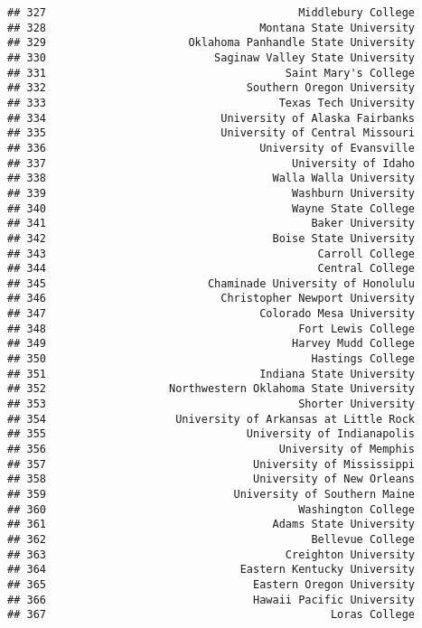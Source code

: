 \documentclass[
]{article}
\begin{document}
\begin{verbatim}
## 327                                       Middlebury College
## 328                                 Montana State University
## 329                      Oklahoma Panhandle State University
## 330                          Saginaw Valley State University
## 331                                     Saint Mary's College
## 332                               Southern Oregon University
## 333                                    Texas Tech University
## 334                           University of Alaska Fairbanks
## 335                           University of Central Missouri
## 336                                 University of Evansville
## 337                                      University of Idaho
## 338                                   Walla Walla University
## 339                                      Washburn University
## 340                                      Wayne State College
## 341                                         Baker University
## 342                                   Boise State University
## 343                                          Carroll College
## 344                                          Central College
## 345                         Chaminade University of Honolulu
## 346                           Christopher Newport University
## 347                                 Colorado Mesa University
## 348                                       Fort Lewis College
## 349                                      Harvey Mudd College
## 350                                         Hastings College
## 351                                 Indiana State University
## 352                   Northwestern Oklahoma State University
## 353                                       Shorter University
## 354                    University of Arkansas at Little Rock
## 355                               University of Indianapolis
## 356                                    University of Memphis
## 357                                University of Mississippi
## 358                                University of New Orleans
## 359                             University of Southern Maine
## 360                                       Washington College
## 361                                   Adams State University
## 362                                         Bellevue College
## 363                                     Creighton University
## 364                              Eastern Kentucky University
## 365                                Eastern Oregon University
## 366                                Hawaii Pacific University
## 367                                            Loras College

\end{verbatim}
\end{document}
